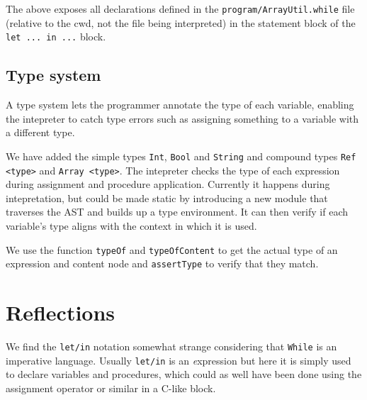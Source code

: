 \documentclass{article}
\begin{document}
The above exposes all declarations defined in the {\tt program/ArrayUtil.while} file (relative to the cwd, not the file being interpreted) in the statement block of the {\tt let ... in ...} block.

\subsection{Type system}
\label{sec:type}
A type system lets the programmer annotate the type of each variable,
enabling the intepreter to catch type errors such as assigning
something to a variable with a different type.

We have added the simple types {\tt Int}, {\tt Bool} and {\tt String}
and compound types {\tt Ref <type>} and {\tt Array <type>}. The
intepreter checks the type of each expression during assignment and
procedure application. Currently it happens during intepretation, but
could be made static by introducing a new module that traverses the
AST and builds up a type environment. It can then verify if each
variable's type aligns with the context in which it is used.

We use the function {\tt typeOf} and {\tt typeOfContent} to get the
actual type of an expression and content node and {\tt assertType} to
verify that they match.

\section{Reflections}
We find the {\tt let/in} notation somewhat strange considering that {\tt While} is an imperative language. Usually {\tt let/in} is an {\textit expression} but here it is simply used to declare variables and procedures, which could as well have been done using the assignment operator or similar in a C-like block.
\end{document}
